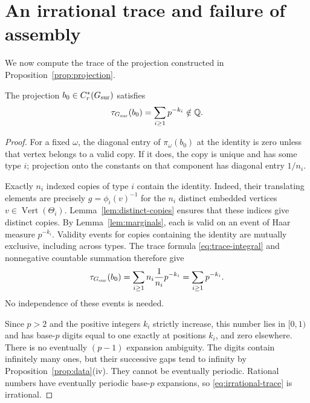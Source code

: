 \section{An irrational trace and failure of assembly}\label{sec:trace}

We now compute the trace of the projection constructed in
Proposition~\ref{prop:projection}.

\begin{proposition}\label{prop:irrational-trace}
The projection \(b_0\in C_r^*(G_{\mathrm{sur}})\) satisfies
\begin{equation}\label{eq:irrational-trace}
\tau_{G_{\mathrm{sur}}}(b_0)=\sum_{i\ge1}p^{-k_i}\notin\mathbb Q.
\end{equation}
\end{proposition}

\begin{proof}
For a fixed \(\omega\), the diagonal entry of \(\pi_\omega(b_0)\) at
the identity is zero unless that vertex belongs to a valid copy. If it
does, the copy is unique and has some type \(i\); projection onto the
constants on that component has diagonal entry \(1/n_i\).

Exactly \(n_i\) indexed copies of type \(i\) contain the identity. Indeed,
their translating elements are precisely
\(g=\phi_i(v)^{-1}\) for the \(n_i\) distinct embedded vertices
\(v\in\operatorname{Vert}(\Theta_i)\).
Lemma~\ref{lem:distinct-copies} ensures that these indices give distinct
copies. By Lemma~\ref{lem:marginals}, each is valid on an event of Haar
measure \(p^{-k_i}\). Validity events for copies containing the identity
are mutually exclusive, including across types. The trace formula
\eqref{eq:trace-integral} and nonnegative countable summation therefore
give
\[
\tau_{G_{\mathrm{sur}}}(b_0)=\sum_{i\ge1}n_i\frac1{n_i}p^{-k_i}
=\sum_{i\ge1}p^{-k_i}.
\]
No independence of these events is needed.

Since \(p>2\) and the positive integers \(k_i\) strictly increase, this
number lies in \([0,1)\) and has base-\(p\) digits equal to one exactly
at positions \(k_i\), and zero elsewhere. There is no eventually
\((p-1)\) expansion ambiguity. The digits contain infinitely many ones,
but their successive gaps tend to infinity by
Proposition~\ref{prop:data}(iv). They cannot be eventually periodic.
Rational numbers have eventually periodic base-\(p\) expansions, so
\eqref{eq:irrational-trace} is irrational.
\end{proof}

